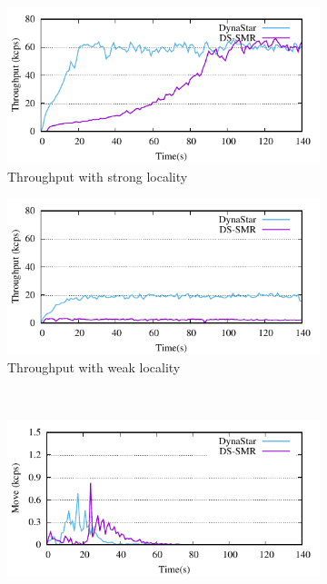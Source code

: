 \begin{figure}[ht]
  \centering
  \begin{subfigure}[b]{0.45\textwidth}
    \centering
    \includegraphics[width=0.95\columnwidth]{figures/experiments/dynastar-vs-dssmr-4p-0-tp}
    \caption{Throughput with strong locality}
  \end{subfigure}
  \begin{subfigure}[b]{0.45\textwidth}
    \centering
    \includegraphics[width=0.95\columnwidth]{figures/experiments/dynastar-vs-dssmr-4p-5-tp}
    \caption{Throughput with weak locality}
  \end{subfigure} \\
  \begin{subfigure}[b]{0.45\textwidth}
    \centering
    \includegraphics[width=0.95\columnwidth]{figures/experiments/dynastar-vs-dssmr-4p-0-move}

\end{subfigure}
\end{figure}
